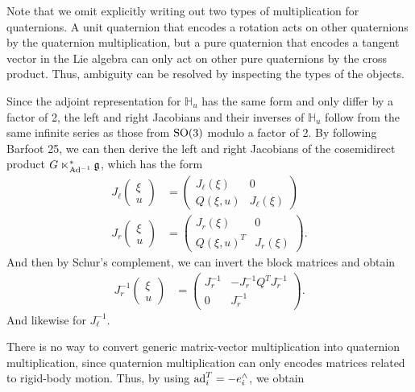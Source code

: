 \documentclass[12pt,class=article,crop=false]{standalone}
\begin{document}
Note that we omit explicitly writing out two types of multiplication for quaternions. A unit quaternion that encodes a rotation acts on other quaternions by the quaternion multiplication, but a pure quaternion that encodes a tangent vector in the Lie algebra can only act on other pure quaternions by the cross product. Thus, ambiguity can be resolved by inspecting the types of the objects.

Since the adjoint representation for $ \mathbb{ H}_u$ has the same form and only differ by a factor of 2, the left and right Jacobians and their inverses of $ \mathbb{ H}_u $ follow from the same infinite series as those from $ \operatorname{SO}(3)$ modulo a factor of 2. By following Barfoot 25, we can then derive the left and right Jacobians of the cosemidirect product  $ G \ltimes_{\operatorname{Ad}^{-1}}^* \mathfrak{g} $, which has the form
\begin{align*}
	J_{\ell} \begin{pmatrix} \xi \\ u \end{pmatrix} &= \begin{pmatrix} J_\ell(\xi) & 0\\  Q(\xi,u) & J_{\ell}(\xi)\end{pmatrix}  \\
	J_r \begin{pmatrix} \xi\\u \end{pmatrix} &= \begin{pmatrix} J_r(\xi)&0\\ Q(\xi,u)^{T}& J_r(\xi) \end{pmatrix}  .
\end{align*}
And then by Schur's complement, we can invert the block matrices and obtain
\begin{align*}
	J_{r}^{-1} \begin{pmatrix} \xi\\u \end{pmatrix} &= \begin{pmatrix} J_{r}^{-1} & -J_{r}^{-1}Q^{T} J_r^{-1} \\ 0 & J_r^{-1} \end{pmatrix}  .
\end{align*}
And likewise for $ J_\ell^{-1}$. 

There is no way to convert generic matrix-vector multiplication into quaternion multiplication, since quaternion multiplication can only encodes matrices related to rigid-body motion. Thus, by using $ \operatorname{ad}_{ i}^{T} =  - e_i^\wedge $, we obtain
\end{document}
